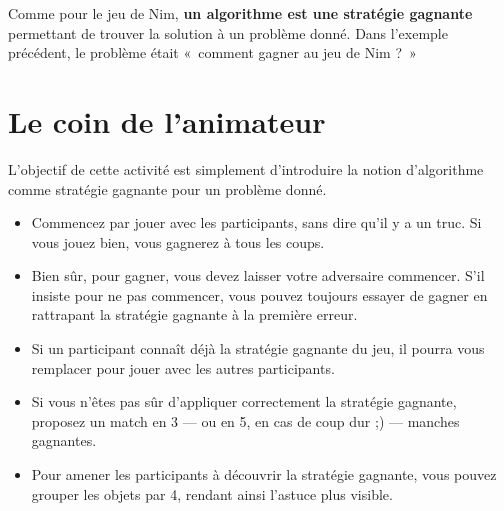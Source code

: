 \documentclass[a5paper,pagesize,DIV=14]{scrbook}
\begin{document}
Comme pour le jeu de Nim, \textbf{un algorithme est une stratégie gagnante}
permettant de trouver la solution à un problème donné. Dans l'exemple précédent,
le problème était «~comment gagner au jeu de Nim ?~»


\section*{Le coin de l'animateur}

L'objectif de cette activité est simplement d'introduire la notion d'algorithme
comme stratégie gagnante pour un problème donné.

\begin{itemize}
\item Commencez par jouer avec les participants, sans dire qu'il y a un truc. Si
  vous jouez bien, vous gagnerez à tous les coups.
\item Bien sûr, pour gagner, vous devez laisser votre adversaire commencer.
  S'il insiste pour ne pas commencer, vous pouvez toujours essayer de gagner en
  rattrapant la stratégie gagnante à la première erreur.
\item Si un participant connaît déjà la stratégie gagnante du jeu, il pourra
  vous remplacer pour jouer avec les autres participants.
\item Si vous n'êtes pas sûr d'appliquer correctement la stratégie gagnante,
  proposez un match en 3 --- ou en 5, en cas de coup dur ;) --- manches
  gagnantes.
\item Pour amener les participants à découvrir la stratégie gagnante, vous
  pouvez grouper les objets par 4, rendant ainsi l'astuce plus visible.
\end{itemize}
\end{document}
